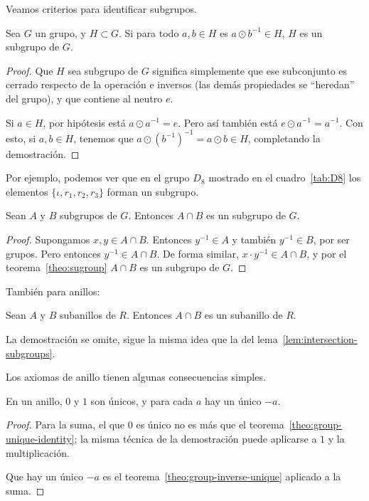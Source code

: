   Veamos criterios para identificar subgrupos.
  \begin{theorem}
    \label{theo:sugroup}
    Sea \(G\) un grupo,
    y \(H \subset G\).
    Si para todo \(a, b \in H\) es \(a \odot b^{-1} \in H\),
    \(H\) es un subgrupo de \(G\).
  \end{theorem}
  \begin{proof}
    Que \(H\) sea subgrupo de \(G\) significa simplemente
    que ese subconjunto es cerrado respecto de la operación e inversos
    (las demás propiedades se ``heredan'' del grupo),
    y que contiene al neutro \(e\).

    Si \(a \in H\),
    por hipótesis está \(a \odot a^{-1} = e\).
    Pero así también está \(e \odot a^{-1} = a^{-1}\).
    Con esto,
    si \(a, b \in H\),
    tenemos que \(a \odot (b^{-1})^{-1} = a \odot b \in H\),
    completando la demostración.
  \end{proof}
  Por ejemplo,
  podemos ver que en el grupo \(D_8\) mostrado en el cuadro~\ref{tab:D8}
  los elementos \(\{\iota, r_1, r_2, r_3\}\) forman un subgrupo.
  \begin{lemma}
    \label{lem:intersection-subgroups}
    Sean \(A\) y \(B\) subgrupos de \(G\).
    Entonces \(A \cap B\) es un subgrupo de \(G\).
  \end{lemma}
  \begin{proof}
    Supongamos \(x, y \in A \cap B\).
    Entonces \(y^{-1} \in A\) y también \(y^{-1} \in B\),
    por ser grupos.
    Pero entonces \(y^{-1} \in A \cap B\).
    De forma similar,
    \(x \cdot y^{-1} \in A \cap B\),
    y por el teorema~\ref{theo:sugroup} \(A \cap B\) es un subgrupo de \(G\).
  \end{proof}
  También para anillos:
  \begin{lemma}
    \label{lem:intersection-subrings}
    Sean \(A\) y \(B\) subanillos de \(R\).
    Entonces \(A \cap B\) es un subanillo de \(R\).
  \end{lemma}
  La demostración se omite,
  sigue la misma idea que la del lema~\ref{lem:intersection-subgroups}.

  Los axiomas de anillo tienen algunas consecuencias simples.
  \begin{theorem}
    \label{theo:ring-01}
    En un anillo,
    \(0\) y \(1\) son únicos,
    y para cada \(a\) hay un único \(-a\).
  \end{theorem}
  \begin{proof}
    Para la suma,
    el que \(0\) es único
    no es más que el teorema~\ref{theo:group-unique-identity};
    la misma técnica de la demostración puede aplicarse
    a \(1\) y la multiplicación.

    Que hay un único \(-a\) es el teorema~\ref{theo:group-inverse-unique}
    aplicado a la suma.
  \end{proof}

